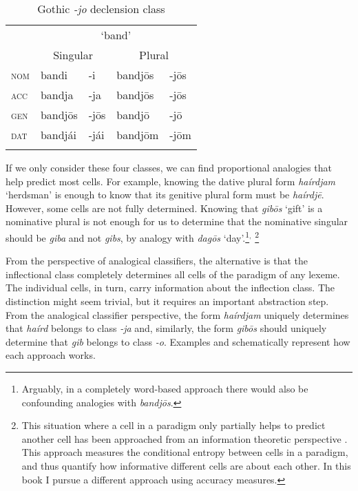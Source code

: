 \begin{table}[t]
  \centering
  \caption{Gothic \textit{-jo} declension class}\label{tab:jo-class-gothic}
  \begin{tabular}{lllll}
    \lsptoprule
        & \multicolumn{4}{c}{`band'}                                \\
        & \multicolumn{2}{c}{Singular} & \multicolumn{2}{c}{Plural} \\
    \midrule
    \textsc{nom} & bandi                        & -i   & bandjōs & -jōs      \\
    \textsc{acc} & bandja                       & -ja  & bandjōs & -jōs      \\
    \textsc{gen} & bandjōs                      & -jōs & bandjō  & -jō       \\
    \textsc{dat} & bandjái                      & -jái & bandjōm & -jōm      \\
    \lspbottomrule
  \end{tabular}
\end{table}

If we only consider these four classes, we can find proportional analogies that help predict most cells. For example, knowing the dative plural form \textit{haírdjam} `herdsman' is enough to know that its genitive plural form must be \textit{haírdjē}. However, some cells are not fully determined. Knowing that \textit{gibōs} `gift' is a nominative plural is not enough for us to determine that the nominative singular should be \textit{giba} and not \textit{gibs}, by analogy with \textit{dagōs} `day'.\footnote{Arguably, in a completely word-based approach there would also be confounding analogies with \textit{bandjōs}.}$^{,}$ \footnote{This situation where a cell in a paradigm only partially helps to predict another cell has been approached from an information theoretic perspective \autocite{MoscosodelPradoMartin.2004a, Ackerman.2013a, Blevins.2013, Ackerman.2016, Bonami.2016}. This approach measures the conditional entropy between cells in a paradigm, and thus quantify how informative different cells are about each other. In this book I pursue a different approach using accuracy measures.}

\largerpage[2]
From the perspective of analogical classifiers, the alternative is that the inflectional class completely determines all cells of the paradigm of any lexeme. The individual cells, in turn, carry information about the inflection class. The distinction might seem trivial, but it requires an important abstraction step. From the analogical classifier perspective, the form \textit{haírdjam} uniquely determines that \textit{haírd} belongs to class \textit{-ja} and, similarly, the form \textit{gibōs} should uniquely determine that \textit{gib} belongs to class \textit{-o}. Examples  and  schematically represent how each approach works.

